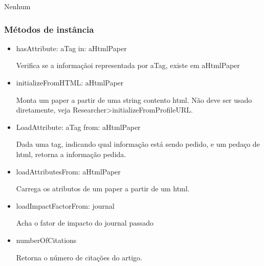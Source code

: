 Nenhum

\subsubsection{Métodos de instância}

\begin{itemize}

  \item hasAttribute: aTag in: aHtmlPaper

  Verifica se a informaçãoi representada por aTag, existe em aHtmlPaper

  \item initializeFromHTML: aHtmlPaper

  Monta um paper a partir de uma string contento html. Não deve ser usado diretamente, veja   Researcher>initializeFromProfileURL.

  \item LoadAttribute: aTag from: aHtmlPaper

  Dada uma tag, indicando qual informação está sendo pedido, e um pedaço de html, retorna a   informação pedida.

  \item loadAttributesFrom: aHtmlPaper

  Carrega os atributos de um paper a partir de um html.

  \item loadImpactFactorFrom: journal

  Acha o fator de impacto do journal passado

  \item numberOfCitations

  Retorna o número de citações do artigo.

\end{itemize}
